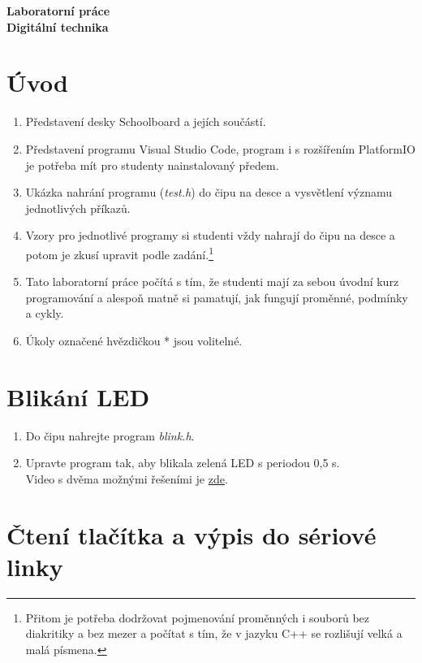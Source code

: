 \documentclass[12pt]{article}
\begin{document}
\begin{center}
	\large \textbf{Laboratorní práce} \\  
	\Huge \textbf{Digitální technika} 
\end{center}

\section{Úvod}

\begin{enumerate}
	\item Představení desky Schoolboard a jejích součástí. 
	\item Představení programu Visual Studio Code, program i s rozšířením PlatformIO je potřeba mít pro studenty nainstalovaný předem. 
	\item Ukázka nahrání programu (\textit{test.h}) do čipu na desce a vysvětlení významu jednotlivých příkazů. 
	\item Vzory pro jednotlivé programy si studenti vždy nahrají do čipu na desce a potom je zkusí upravit podle 
	zadání.\footnote{Přitom je potřeba dodržovat pojmenování proměnných i souborů bez diakritiky a bez mezer 
	a počítat s tím, že v jazyku C++ se rozlišují velká a malá písmena. } 
	\item Tato laboratorní práce počítá s tím, že studenti mají za sebou úvodní kurz programování a alespoň matně si pamatují, jak fungují proměnné, podmínky a cykly.
	\item Úkoly označené hvězdičkou * jsou volitelné. 
	
\end{enumerate}

\section{Blikání LED}

\begin{enumerate} 
	\item Do čipu nahrejte program \textit{blink.h}. 
	\item Upravte program tak, aby blikala zelená LED s periodou 0,5 s. \\
	Video s dvěma možnými řešeními je \href{https://www.youtube.com/watch?reload=9&v=ZFAgfd_2ZHE&feature=youtu.be}{zde}.
	
\end{enumerate} 

\section{Čtení tlačítka a výpis do sériové linky}
\end{document}
